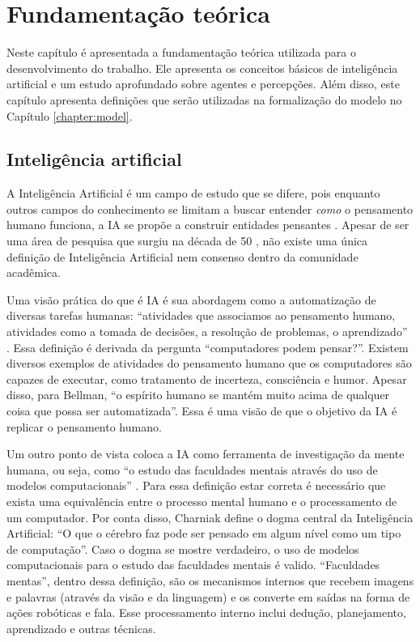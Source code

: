 \chapter{Fundamentação teórica}

\label{conceitos-fundamentais}

%
Neste capítulo é apresentada a fundamentação teórica utilizada para o desenvolvimento do trabalho. Ele apresenta os conceitos básicos de inteligência artificial e um estudo aprofundado sobre agentes e percepções. Além disso, este capítulo apresenta definições que serão utilizadas na formalização do modelo no Capítulo \ref{chapter:model}.

\section{Inteligência artificial}

A Inteligência Artificial é um campo de estudo que se difere, pois enquanto outros campos do conhecimento se limitam a buscar entender \textit{como} o pensamento humano funciona, a IA se propõe a construir entidades pensantes \cite{russel2013artificial}. Apesar de ser uma área de pesquisa que surgiu na década de 50 \cite{moor2006dartmouth}, não existe uma única definição de Inteligência Artificial nem consenso dentro da comunidade acadêmica.

Uma visão prática do que é IA é sua abordagem como a automatização de diversas tarefas humanas: ``atividades que associamos ao pensamento humano, atividades como a tomada de decisões, a resolução de problemas, o aprendizado'' \cite{bellman1978introduction}. Essa definição é derivada da pergunta ``computadores podem pensar?''. Existem diversos exemplos de atividades do pensamento humano que os computadores são capazes de executar, como tratamento de incerteza, consciência e humor. Apesar disso, para Bellman, ``o espírito humano se mantém muito acima de qualquer coisa que possa ser automatizada''. Essa é uma visão de que o objetivo da IA é replicar o pensamento humano.

Um outro ponto de vista coloca a IA como ferramenta de investigação da mente humana, ou seja, como ``o estudo das faculdades mentais através do uso de modelos computacionais'' \cite{charniak1985introduction}. Para essa definição estar correta é necessário que exista uma equivalência entre o processo mental humano e o processamento de um computador. Por conta disso, Charniak define o dogma central da Inteligência Artificial: ``O que o cérebro faz pode ser pensado em algum nível como um tipo de computação''. Caso o dogma se mostre verdadeiro, o uso de modelos computacionais para o estudo das faculdades mentais é valido. ``Faculdades mentas'', dentro dessa definição, são os mecanismos internos que recebem imagens e palavras (através da visão e da linguagem) e os converte em saídas na forma de ações robóticas e fala. Esse processamento interno inclui dedução, planejamento, aprendizado e outras técnicas.

